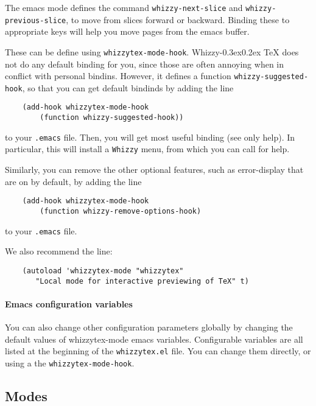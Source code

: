 \documentclass{article}
\let \lst \verb
\def \whizzy{{Whizzy\kern -0.3ex\raise 0.2ex \hbox{\TeX}}}
\begin{document}
The emacs mode defines the command \lst"whizzy-next-slice" and
\lst"whizzy-previous-slice", to move from slices forward or backward.
Binding these to appropriate keys will help you move pages from the emacs
buffer. 

These can be define using \lst"whizzytex-mode-hook". 
{\whizzy} does not do any default binding for you, since those are often
annoying when in conflict with personal bindins. 
However, it defines a function \lst"whizzy-suggested-hook", so that you can
get default bindinds by adding the line
\begin{verbatim}
    (add-hook whizzytex-mode-hook 
        (function whizzy-suggested-hook))
\end{verbatim}
to your \lst".emacs" file. 
Then, you will get most useful binding (see only help). 
In particular, this will install a \lst"Whizzy" menu, from which you can
call for help.

Similarly, you can remove the other optional features, 
such as error-display that are on by default, by adding the line
\begin{verbatim}
    (add-hook whizzytex-mode-hook 
        (function whizzy-remove-options-hook)
\end{verbatim}
to your \lst".emacs" file.

We also recommend the line:
\begin{verbatim}
    (autoload 'whizzytex-mode "whizzytex" 
       "Local mode for interactive previewing of TeX" t)
\end{verbatim}

\paragraph {Emacs configuration variables}

You can also change other configuration parameters globally by changing the
default values of whizzytex-mode emacs variables. 
Configurable variables are all listed at the beginning of the
\lst"whizzytex.el" file. You can change them directly, or using a 
the \lst"whizzytex-mode-hook". 


\subsection {Modes} 
\label {modes}
\end{document}
